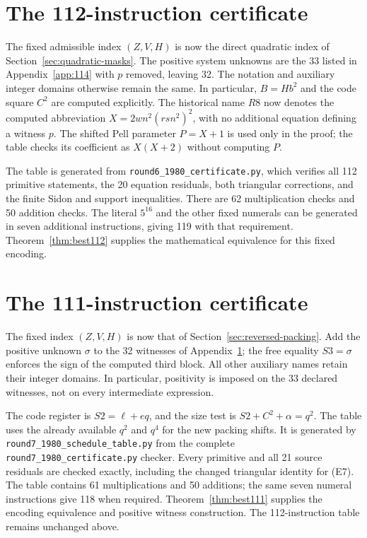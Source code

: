 \documentclass[11pt,letterpaper]{article}
\theoremstyle{definition}
\theoremstyle{remark}
\numberwithin{equation}{section}
\newcommand{\file}[1]{\texttt{#1}}
\begin{document}
\small


\clearpage
\normalsize
\section{The 112-instruction certificate}\label{app:112}

The fixed admissible index $(Z,V,H)$ is now the direct quadratic index
of Section~\ref{sec:quadratic-masks}. The positive system unknowns are
the 33 listed in Appendix~\ref{app:114} with $p$ removed, leaving 32.
The notation and auxiliary integer domains otherwise remain the same.
In particular, $B=Hb^2$ and the code square $C^2$ are computed explicitly.
The historical name $\mathit{R8}$ now denotes the computed abbreviation
$X=2wn^2(rs n^2)^2$, with no additional equation defining a witness $p$.
The shifted Pell parameter $P=X+1$ is used only in the proof; the table
checks its coefficient as $X(X+2)$ without computing $P$.

The table is generated from \file{round6\_1980\_certificate.py}, which
verifies all 112 primitive statements, the 20 equation residuals, both
triangular corrections, and the finite Sidon and support inequalities.
There are 62 multiplication checks and 50 addition checks. The literal
$5^{16}$ and the other fixed numerals can be generated in seven additional
instructions, giving 119 with that requirement. Theorem~\ref{thm:best112}
supplies the mathematical equivalence for this fixed encoding.

\small


\clearpage
\normalsize
\section{The 111-instruction certificate}\label{app:111}

The fixed index $(Z,V,H)$ is now that of
Section~\ref{sec:reversed-packing}. Add the positive unknown $\sigma$ to
the 32 witnesses of Appendix~\ref{app:112}; the free equality
$\mathit{S3}=\sigma$ enforces the sign of the computed third block.
All other auxiliary names retain their integer domains. In particular,
positivity is imposed on the 33 declared witnesses, not on every
intermediate expression.

The code register is $\mathit{S2}=\ell+eq$, and the size test is
$\mathit{S2}+C^2+\alpha=q^2$. The table uses the already available $q^2$
and $q^4$ for the new packing shifts. It is generated by
\file{round7\_1980\_schedule\_table.py} from the complete
\file{round7\_1980\_certificate.py} checker. Every primitive and all
21 source residuals are checked exactly, including the changed triangular
identity for (E7). The table contains 61 multiplications and 50 additions;
the same seven numeral instructions give 118 when required.
Theorem~\ref{thm:best111} supplies the encoding equivalence and positive
witness construction. The 112-instruction table remains unchanged above.
\end{document}
